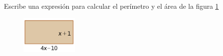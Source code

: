 \question[10] Escribe una expresión para calcular el perímetro y el área de la figura \ref{fig:20230319044600}

\begin{figure}[H]
    \centering
    \includegraphics[width=0.25\textwidth]{../images/20230319044600}
    \caption{}
    \label{fig:20230319044600}
\end{figure}
